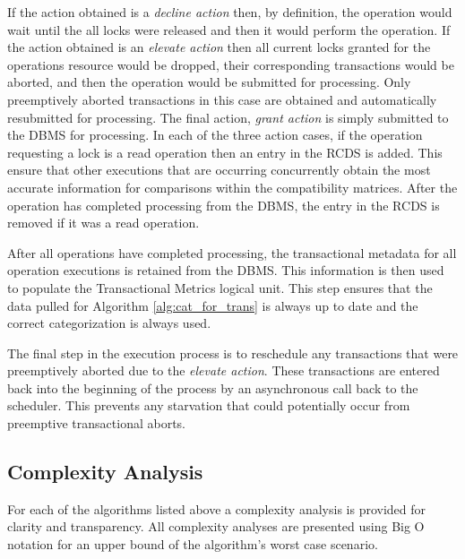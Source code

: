 \documentclass[conference]{IEEEtran}
\begin{document}
If the action obtained is a \textit{decline action} then, by definition, the operation would wait until the all locks were released and then it would perform the operation. If the action obtained is an \textit{elevate action} then all current locks granted for the operations resource would be dropped, their corresponding transactions would be aborted, and then the operation would be submitted for processing. Only preemptively aborted transactions in this case are obtained and automatically resubmitted for processing. The final action, \textit{grant action} is simply submitted to the DBMS for processing. In each of the three action cases, if the operation requesting a lock is a read operation then an entry in the RCDS is added. This ensure that other executions that are occurring concurrently obtain the most accurate information for comparisons within the compatibility matrices. After the operation has completed processing from the DBMS, the entry in the RCDS is removed if it was a read operation.

After all operations have completed processing, the transactional metadata for all operation executions is retained from the DBMS. This information is then used to populate the Transactional Metrics logical unit. This step ensures that the data pulled for Algorithm \ref{alg:cat_for_trans} is always up to date and the correct categorization is always used.

The final step in the execution process is to reschedule any transactions that were preemptively aborted due to the \textit{elevate action}. These transactions are entered back into the beginning of the process by an asynchronous call back to the scheduler. This prevents any starvation that could potentially occur from preemptive transactional aborts.

\subsection{Complexity Analysis}
For each of the algorithms listed above a complexity analysis is provided for clarity and transparency. All complexity analyses are presented using Big O notation for an upper bound of the algorithm's worst case scenario.

\end{document}

